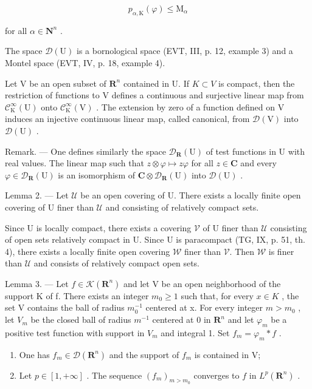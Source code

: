 \[
p _ {\alpha , \mathrm{K}} (\varphi) \leqslant \mathrm{M} _ {\alpha}
\]

for all \(\alpha\in\mathbf{N}^{n}\) .

The space \(\mathcal{D}(\mathrm{U})\) is a bornological space (EVT, III, p. 12, example 3) and a Montel space (EVT, IV, p. 18, example 4).

Let V be an open subset of \(\mathbf{R}^{n}\) contained in U. If \(K \subset V\) is compact, then the restriction of functions to V defines a continuous and surjective linear map from \(\mathcal{C}_{\mathrm{K}}^{\infty}(\mathrm{U})\) onto \(\mathcal{C}_{\mathrm{K}}^{\infty}(\mathrm{V})\) . The extension by zero of a function defined on V induces an injective continuous linear map, called canonical, from \(\mathcal{D}(\mathrm{V})\) into \(\mathcal{D}(\mathrm{U})\) .

Remark. --- One defines similarly the space \(\mathcal{D}_{\mathbf{R}}(\mathrm{U})\) of test functions in U with real values. The linear map such that \(z \otimes \varphi \mapsto z\varphi\) for all \(z \in \mathbf{C}\) and every \(\varphi \in \mathcal{D}_{\mathbf{R}}(\mathrm{U})\) is an isomorphism of \(\mathbf{C} \otimes \mathcal{D}_{\mathbf{R}}(\mathrm{U})\) into \(\mathcal{D}(\mathrm{U})\) .

Lemma 2. --- Let \(\mathcal{U}\) be an open covering of U. There exists a locally finite open covering of U finer than \(\mathcal{U}\) and consisting of relatively compact sets.

Since U is locally compact, there exists a covering \(\mathcal{V}\) of U finer than \(\mathcal{U}\) consisting of open sets relatively compact in U. Since U is paracompact (TG, IX, p. 51, th. 4), there exists a locally finite open covering \(\mathcal{W}\) finer than \(\mathcal{V}\). Then \(\mathcal{W}\) is finer than \(\mathcal{U}\) and consists of relatively compact open sets.

Lemma 3. --- Let \(f \in \mathcal{K}(\mathbf{R}^n)\) and let V be an open neighborhood of the support K of f. There exists an integer \(m_0 \geqslant 1\) such that, for every \(x \in K\) , the set V contains the ball of radius \(m_0^{-1}\) centered at x. For every integer \(m > m_0\) , let \(V_m\) be the closed ball of radius \(m^{-1}\) centered at 0 in \(\mathbf{R}^{n}\) and let \(\varphi_{m}\) be a positive test function with support in \(V_{m}\) and integral 1. Set \(f_{m} = \varphi_{m} * f\) .

\begin{enumerate}
\def\labelenumi{\alph{enumi})}
\item
  One has \(f_{m}\in \mathcal{D}(\mathbf{R}^{n})\) and the support of \(f_{m}\) is contained in V;
\item
  Let \(p \in [1, +\infty]\) . The sequence \((f_m)_{m > m_0}\) converges to \(f\) in \(L^p(\mathbf{R}^n)\) .
\end{enumerate}

